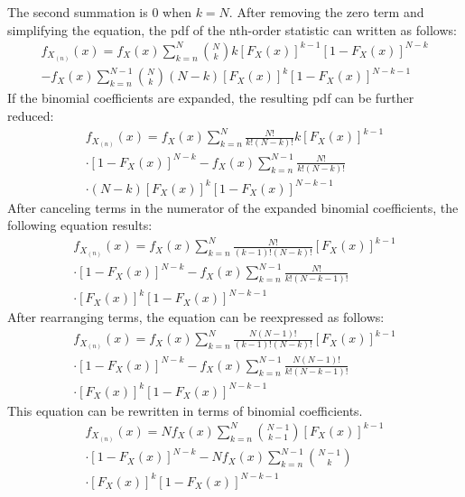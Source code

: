 \documentclass[conference]{IEEEtran}
\begin{document}
The second summation is 0 when $k=N$. After removing the zero term and simplifying the equation, the pdf of the nth-order statistic can written as follows:
\begin{equation}
\begin{gathered}
f_{X_{(n)}}(x) = f_X(x)\sum_{k=n}^{N}\binom{N}{k}k[F_X(x)]^{k-1}[1-F_X(x)]^{N-k}\\
- f_X(x)\sum_{k=n}^{N-1}\binom{N}{k}(N-k)[F_X(x)]^{k}[1-F_X(x)]^{N-k-1}
\end{gathered}
\end{equation}
If the binomial coefficients are expanded, the resulting pdf can be further reduced:
\begin{equation}
\begin{gathered}
f_{X_{(n)}}(x) = f_X(x)\sum_{k=n}^{N}\frac{N!}{k!(N-k)!}k[F_X(x)]^{k-1}\\
\cdot[1-F_X(x)]^{N-k} - f_X(x)\sum_{k=n}^{N-1}\frac{N!}{k!(N-k)!}\\
\cdot(N-k)[F_X(x)]^{k}[1-F_X(x)]^{N-k-1}
\end{gathered}
\end{equation}
After canceling terms in the numerator of the expanded binomial coefficients, the following equation results:
\begin{equation}
\begin{gathered}
f_{X_{(n)}}(x) = f_X(x)\sum_{k=n}^{N}\frac{N!}{(k-1)!(N-k)!}[F_X(x)]^{k-1}\\
\cdot[1-F_X(x)]^{N-k} - f_X(x)\sum_{k=n}^{N-1}\frac{N!}{k!(N-k-1)!}\\
\cdot[F_X(x)]^{k}[1-F_X(x)]^{N-k-1}
\end{gathered}
\end{equation}
After rearranging terms, the equation can be reexpressed as follows:
\begin{equation}
\begin{gathered}
f_{X_{(n)}}(x) = f_X(x)\sum_{k=n}^{N}\frac{N(N-1)!}{(k-1)!(N-k)!}[F_X(x)]^{k-1}\\
\cdot[1-F_X(x)]^{N-k} - f_X(x)\sum_{k=n}^{N-1}\frac{N(N-1)!}{k!(N-k-1)!}\\
\cdot[F_X(x)]^{k}[1-F_X(x)]^{N-k-1}
\end{gathered}
\end{equation}
This equation can be rewritten in terms of binomial coefficients.
\begin{equation}
\begin{gathered}
f_{X_{(n)}}(x) = Nf_X(x)\sum_{k=n}^{N}\binom{N-1}{k-1}[F_X(x)]^{k-1}\\
\cdot[1-F_X(x)]^{N-k} - Nf_X(x)\sum_{k=n}^{N-1}\binom{N-1}{k}\\
\cdot[F_X(x)]^{k}[1-F_X(x)]^{N-k-1}
\end{gathered}
\end{equation}
\end{document}

